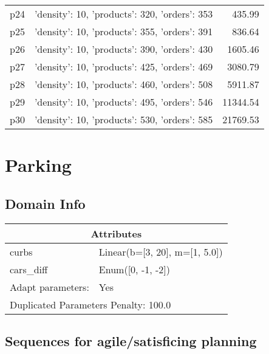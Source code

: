 \documentclass{article}
\begin{document}
\begin{center}
\begin{tabular}{@{}l|r|r@{}}
  p24&{'density': 10, 'products': 320, 'orders': 353}&435.99\\
  p25&{'density': 10, 'products': 355, 'orders': 391}&836.64\\
  p26&{'density': 10, 'products': 390, 'orders': 430}&1605.46\\
  p27&{'density': 10, 'products': 425, 'orders': 469}&3080.79\\
  p28&{'density': 10, 'products': 460, 'orders': 508}&5911.87\\
  p29&{'density': 10, 'products': 495, 'orders': 546}&11344.54\\
  p30&{'density': 10, 'products': 530, 'orders': 585}&21769.53
                            \end{tabular}
                            \end{center}
                    
                            \newpage \section{Parking}
                    \subsection*{Domain Info}

                    \begin{center}
                    \begin{tabular}{@{}p{}p{}@{}}
                    \multicolumn{2}{c}{\bf \large Attributes}\\\midrule
                    curbs & Linear(b=[3, 20], m=[1, 5.0])\\
cars\_diff & Enum([0, -1, -2])
                    
                    \\\midrule
                    Adapt parameters: & Yes
                
                     \\\midrule
                    \multicolumn{2}{l}{Duplicated Parameters Penalty: 100.0}
                    \end{tabular}
                    \end{center}
                
                         \subsection*{Sequences for agile/satisficing planning}
\end{document}
